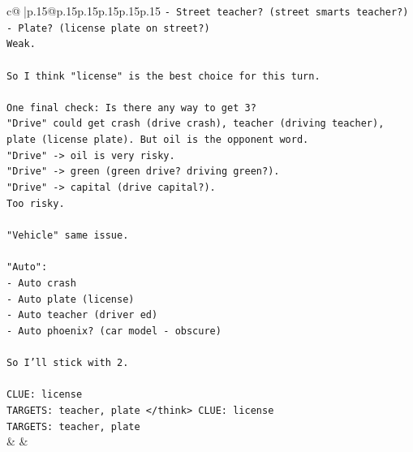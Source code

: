 \documentclass{article}
\begin{document}
{\begin{supertabular}{c@{$\;$}|p{.15\linewidth}@{}p{.15\linewidth}p{.15\linewidth}p{.15\linewidth}p{.15\linewidth}p{.15\linewidth}}
{{{\texttt{{-} Street teacher? (street smarts teacher?)} \\
\texttt{{-} Plate? (license plate on street?)} \\
\texttt{Weak.} \\
\\ 
\texttt{So I think "license" is the best choice for this turn.} \\
\\ 
\texttt{One final check: Is there any way to get 3?} \\
\texttt{"Drive" could get crash (drive crash), teacher (driving teacher), plate (license plate). But oil is the opponent word.} \\
\texttt{"Drive" {-}> oil is very risky.} \\
\texttt{"Drive" {-}> green (green drive? driving green?).} \\
\texttt{"Drive" {-}> capital (drive capital?).} \\
\texttt{Too risky.} \\
\\ 
\texttt{"Vehicle" same issue.} \\
\\ 
\texttt{"Auto":} \\
\texttt{{-} Auto crash} \\
\texttt{{-} Auto plate (license)} \\
\texttt{{-} Auto teacher (driver ed)} \\
\texttt{{-} Auto phoenix? (car model {-} obscure)} \\
\\ 
\texttt{So I'll stick with 2.} \\
\\ 
\texttt{CLUE: license} \\
\texttt{TARGETS: teacher, plate </think> CLUE: license} \\
\texttt{TARGETS: teacher, plate} \\
            }
        }
    }
    & & \\ \\


\end{supertabular}}
\end{document}
